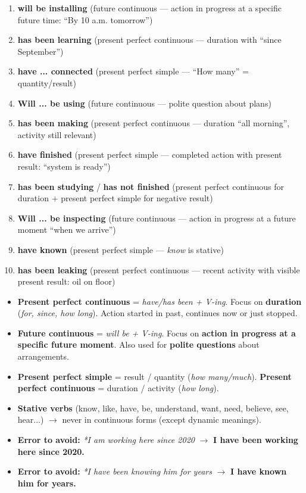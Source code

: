 \documentclass[11pt]{article}
\begin{document}
\begin{corrige}[Exercice n°1]
\begin{enumerate}
    \item \textbf{will be installing} (future continuous — action in progress at a specific future time: ``By 10 a.m. tomorrow'')
    \item \textbf{has been learning} (present perfect continuous — duration with ``since September'')
    \item \textbf{have ... connected} (present perfect simple — ``How many'' = quantity/result)
    \item \textbf{Will ... be using} (future continuous — polite question about plans)
    \item \textbf{has been making} (present perfect continuous — duration ``all morning'', activity still relevant)
    \item \textbf{have finished} (present perfect simple — completed action with present result: ``system is ready'')
    \item \textbf{has been studying} / \textbf{has not finished} (present perfect continuous for duration + present perfect simple for negative result)
    \item \textbf{Will ... be inspecting} (future continuous — action in progress at a future moment ``when we arrive'')
    \item \textbf{have known} (present perfect simple — \emph{know} is stative)
    \item \textbf{has been leaking} (present perfect continuous — recent activity with visible present result: oil on floor)
\end{enumerate}
\end{corrige}

\begin{aretenir}
\begin{itemize}
    \item \textbf{Present perfect continuous} = \emph{have/has been + V-ing}. Focus on \textbf{duration} (\emph{for, since, how long}). Action started in past, continues now or just stopped.
    \item \textbf{Future continuous} = \emph{will be + V-ing}. Focus on \textbf{action in progress at a specific future moment}. Also used for \textbf{polite questions} about arrangements.
    \item \textbf{Present perfect simple} = result / quantity (\emph{how many/much}). \textbf{Present perfect continuous} = duration / activity (\emph{how long}).
    \item \textbf{Stative verbs} (know, like, have, be, understand, want, need, believe, see, hear...) $\rightarrow$ never in continuous forms (except dynamic meanings).
    \item \textbf{Error to avoid:} \emph{*I am working here since 2020} $\rightarrow$ \textbf{I have been working here since 2020.}
    \item \textbf{Error to avoid:} \emph{*I have been knowing him for years} $\rightarrow$ \textbf{I have known him for years.}
\end{itemize}
\end{aretenir}
\end{document}
